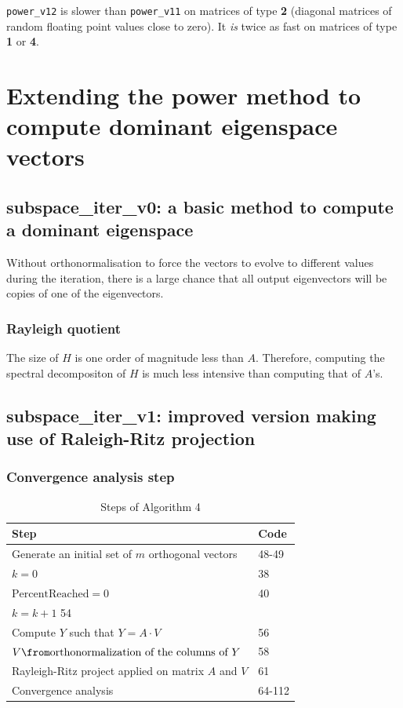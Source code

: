 \documentclass{article}
\begin{document}
\verb|power_v12| is slower than \verb|power_v11| on matrices of type {\bf 2} (diagonal matrices of random floating point values close to zero).
It \emph{is} twice as fast on matrices of type {\bf 1} or {\bf 4}.

\section{Extending the power method to compute dominant eigenspace vectors}

\subsection{subspace_iter_v0: a basic method to compute a dominant eigenspace}

Without orthonormalisation to force the vectors to evolve to different values during the iteration, there is a large chance that all output eigenvectors will be copies of one of the eigenvectors.

\subsubsection{Rayleigh quotient}

The size of $H$ is one order of magnitude less than $A$. Therefore, computing the spectral decompositon of $H$ is much less intensive than computing that of $A$'s.

\subsection{subspace_iter_v1: improved version making use of Raleigh-Ritz projection}

\subsubsection{Convergence analysis step}


\begin{table}[H]
	\centering
	\caption{Steps of Algorithm 4}
	\label{tab:steps-alg-4}
	\begin{tabular}{l|l}
	Step & Code \\\hline
	Generate an initial set of $m$ orthogonal vectors & 48-49 \\
	$k=0$ & 38 \\
	$\text{PercentReached}=0$ & 40 \\
	$k=k+1$ 54 \\
	Compute  $Y$ such that $Y=A \cdot V$ & 56 \\
	$V \from \text{orthonormalization of the columns of $Y$}$ & 58 \\
	Rayleigh-Ritz project applied on matrix $A$ and $V$ & 61 \\
	Convergence analysis & 64-112 \\
	\end{tabular}
\end{table}
\end{document}
